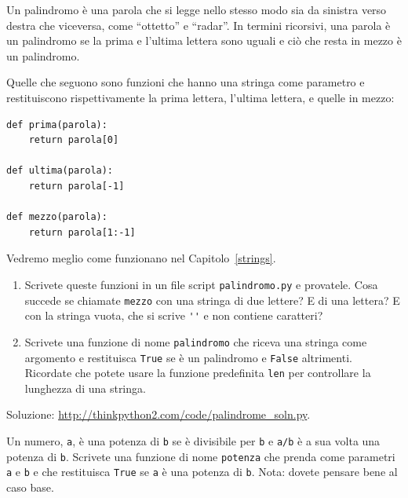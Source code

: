 \documentclass[10pt]{book}
\begin{document}
\vspace{0.2in}
\begin{exercise}
\label{palindrome}

Un palindromo è una parola che si legge nello stesso modo sia da sinistra verso destra che viceversa, come ``ottetto'' e ``radar''. In termini ricorsivi, una parola è un palindromo se la prima e l'ultima lettera sono uguali e ciò che resta in mezzo è un palindromo.

Quelle che seguono sono funzioni che hanno una stringa come parametro e restituiscono rispettivamente la prima lettera, l'ultima lettera, e quelle in mezzo:

\begin{verbatim}
def prima(parola):
    return parola[0]

def ultima(parola):
    return parola[-1]

def mezzo(parola):
    return parola[1:-1]
\end{verbatim}
%
Vedremo meglio come funzionano nel Capitolo~\ref{strings}.

\begin{enumerate}

\item Scrivete queste funzioni in un file script {\tt palindromo.py}
e provatele. Cosa succede se chiamate {\tt mezzo} con una stringa di due lettere?  E di una lettera?  E con la stringa vuota, che si scrive \verb"''" e non contiene caratteri?

\item Scrivete una funzione di nome \verb"palindromo" che riceva una stringa come argomento e restituisca {\tt True} se è un palindromo e {\tt False} altrimenti. Ricordate che potete usare la funzione predefinita {\tt len} per controllare la lunghezza di una stringa.

\end{enumerate}

Soluzione: \url{http://thinkpython2.com/code/palindrome_soln.py}.

\end{exercise}

\vspace{0.2in}
\begin{exercise}

Un numero, {\tt a}, è una potenza di {\tt b} se è divisibile per {\tt b}
e {\tt a/b} è a sua volta una potenza di {\tt b}.  Scrivete una funzione di nome
\verb"potenza" che prenda come parametri {\tt a} e {\tt b}
e che restituisca {\tt True} se {\tt a} è una potenza di {\tt b}.
Nota: dovete pensare bene al caso base.

\end{exercise}
\end{document}
